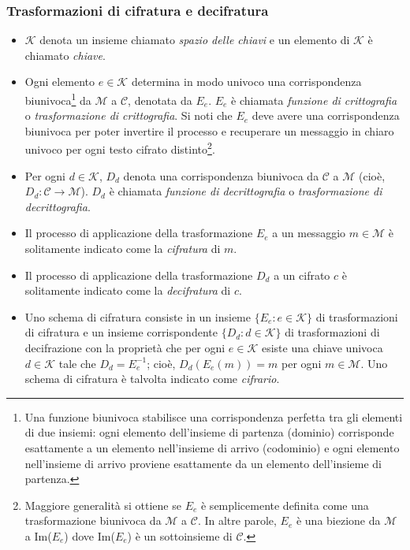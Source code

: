 \documentclass{article}
\theoremstyle{definition}
\begin{document}
\subsubsection{Trasformazioni di cifratura e decifratura}
\begin{itemize}
    \item \( \mathcal{K} \) denota un insieme chiamato \textit{spazio delle chiavi} e un elemento di \( \mathcal{K} \) è chiamato \emph{chiave}.
    \item Ogni elemento \( e \in \mathcal{K} \) determina in modo univoco una corrispondenza biunivoca\footnote{Una funzione biunivoca stabilisce una corrispondenza perfetta tra gli elementi di due insiemi: ogni elemento dell'insieme di partenza (dominio) corrisponde esattamente a un elemento nell'insieme di arrivo (codominio) e ogni elemento nell'insieme di arrivo proviene esattamente da un elemento dell'insieme di partenza.} da \( \mathcal{M} \) a \( \mathcal{C} \), denotata da \( E_e \). \( E_e \) è chiamata \textit{funzione di crittografia} o \textit{trasformazione di crittografia}. Si noti che \( E_e \) deve avere una corrispondenza biunivoca per poter invertire il processo e recuperare un messaggio in chiaro univoco per ogni testo cifrato distinto\footnote{Maggiore generalità si ottiene se \( E_e \) è semplicemente definita come una trasformazione biunivoca da \( \mathcal{M} \) a \( \mathcal{C} \). In altre parole,
\( E_e \) è una biezione da \( \mathcal{M} \) a Im(\( E_e \)) dove Im(\( E_e \)) è un sottoinsieme di \( \mathcal{C} \).}.
    \item Per ogni \( d \in \mathcal{K} \), \( D_d \) denota una corrispondenza biunivoca da \( \mathcal{C} \) a \( \mathcal{M} \) (cioè, \( D_d: \mathcal{C} \rightarrow \mathcal{M} \)). \( D_d \) è chiamata \textit{funzione di decrittografia} o \textit{trasformazione di decrittografia}.
    \item Il processo di applicazione della trasformazione \( E_e \) a un messaggio \( m \in \mathcal{M} \) è solitamente indicato come la \textit{cifratura} di \( m \).
    \item Il processo di applicazione della trasformazione \( D_d \) a un cifrato \( c \) è solitamente indicato come la \textit{decifratura} di \( c \).
    \item Uno schema di cifratura consiste in un insieme \( \{E_e : e \in \mathcal{K}\} \) di trasformazioni di cifratura e un insieme corrispondente \( \{D_d : d \in \mathcal{K}\} \) di trasformazioni di decifrazione con la proprietà che per ogni \( e \in \mathcal{K} \) esiste una chiave univoca \( d \in \mathcal{K} \) tale che \( D_d = E^{-1}_e \); cioè, \( D_d(E_e(m)) = m \) per ogni \( m \in \mathcal{M} \). Uno schema di cifratura è talvolta indicato come \textit{cifrario}.

\end{itemize}
\end{document}
